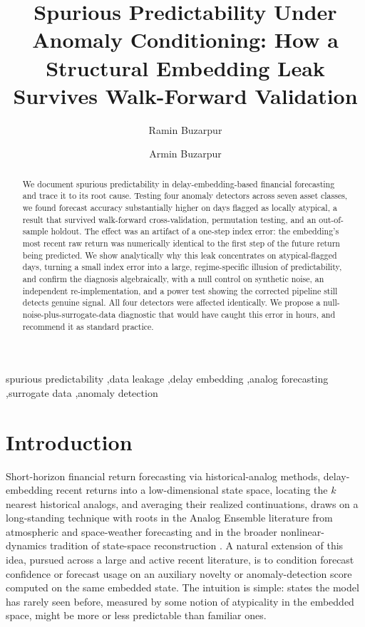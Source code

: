 \documentclass[preprint,12pt]{elsarticle}
\begin{document}
\sloppy

\begin{frontmatter}

\title{Spurious Predictability Under Anomaly Conditioning: How a Structural Embedding Leak Survives Walk-Forward Validation}

\author[a1]{Ramin Buzarpur}
\author[a2]{Armin Buzarpur}
\address[a1]{Department of Computer Engineering (affiliation to be confirmed)}
\address[a2]{Department of Electrical Engineering, Control Systems (affiliation to be confirmed)}

\begin{abstract}
We document spurious predictability in delay-embedding-based financial forecasting and trace it
to its root cause. Testing four anomaly detectors across seven asset classes, we found forecast
accuracy substantially higher on days flagged as locally atypical, a result that survived
walk-forward cross-validation, permutation testing, and an out-of-sample holdout. The effect was
an artifact of a one-step index error: the embedding's most recent raw return was numerically
identical to the first step of the future return being predicted. We show analytically why this
leak concentrates on atypical-flagged days, turning a small index error into a large,
regime-specific illusion of predictability, and confirm the diagnosis algebraically, with a null
control on synthetic noise, an independent re-implementation, and a power test showing the
corrected pipeline still detects genuine signal. All four detectors were affected identically.
We propose a null-noise-plus-surrogate-data diagnostic that would have caught this error in
hours, and recommend it as standard practice.
\end{abstract}

\begin{keyword}
spurious predictability \sep data leakage \sep delay embedding \sep analog forecasting \sep surrogate data \sep anomaly detection
\end{keyword}

\end{frontmatter}

\section{Introduction}

Short-horizon financial return forecasting via historical-analog methods, delay-embedding
recent returns into a low-dimensional state space, locating the $k$ nearest historical
analogs, and averaging their realized continuations, draws on a long-standing technique with
roots in the Analog Ensemble literature from atmospheric and space-weather forecasting
\citep{dellemonache2011} and in the broader nonlinear-dynamics tradition of state-space
reconstruction \citep{takens1981,kantz2004}. A natural extension of this idea, pursued across a
large and active recent literature, is to condition forecast confidence or forecast usage on
an auxiliary novelty or anomaly-detection score computed on the same embedded state. The
intuition is simple: states the model has rarely seen before, measured by some notion of
atypicality in the embedded space, might be more or less predictable than familiar ones.
\end{document}
